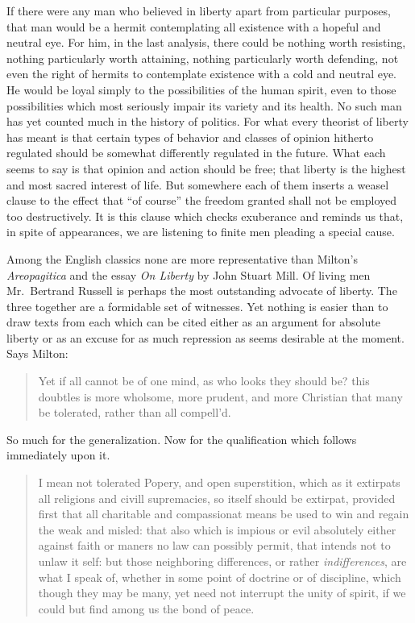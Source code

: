 \documentclass[openany,nobib,nohyper]{tufte-book}
\begin{document}
If there were any man who believed in liberty apart from particular
purposes, that man would be a hermit contemplating all existence with a
hopeful and neutral eye. For him, in the last analysis, there could be
nothing worth resisting, nothing particularly worth attaining, nothing
particularly worth defending, not even the right of hermits to
contemplate existence with a cold and neutral eye. He would be loyal
simply to the possibilities of the human spirit, even to those
possibilities which most seriously impair its variety and its health. No
such man has yet counted much in the history of politics. For what every
theorist of liberty has meant is that certain types of behavior and
classes of opinion hitherto regulated should be somewhat differently
regulated in the future. What each seems to say is that opinion and
action should be free; that liberty is the highest and most sacred
interest of life. But somewhere each of them inserts a weasel clause to
the effect that ``of course'' the freedom granted shall not be employed
too destructively. It is this clause which checks exuberance and reminds
us that, in spite of appearances, we are listening to finite men
pleading a special cause.

Among the English classics none are more representative than Milton's
\emph{Areopagitica} and the essay \emph{On Liberty} by John Stuart Mill.
Of living men Mr.~Bertrand Russell is perhaps the most outstanding
advocate of liberty. The three together are a formidable set of
witnesses. Yet nothing is easier than to draw texts from each which can
be cited either as an argument for absolute liberty or as an excuse for
as much repression as seems desirable at the moment. Says Milton:

\begin{quote}
Yet if all cannot be of one mind, as who looks they should be? this
doubtles is more wholsome, more prudent, and more Christian that many be
tolerated, rather than all compell'd.~
\end{quote}

So much for the generalization. Now for the qualification which follows
immediately upon it.

\begin{quote}
I mean not tolerated Popery, and open superstition, which as it
extirpats all religions and civill supremacies, so itself should be
extirpat, provided first that all charitable and compassionat means be
used to win and regain the weak and misled: that also which is impious
or evil absolutely either against faith or maners no law can possibly
permit, that intends not to unlaw it self: but those neighboring
differences, or rather \emph{indifferences}, are what I speak of,
whether in some point of doctrine or of discipline, which though they
may be many, yet need not interrupt the unity of spirit, if we could but
find among us the bond of peace.
\end{quote}
\end{document}

